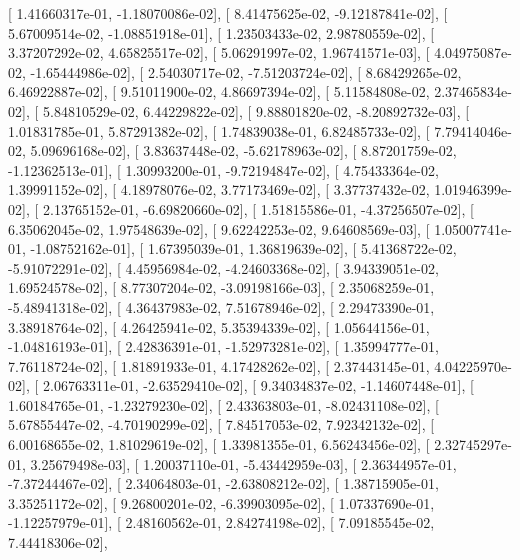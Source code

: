 \documentclass{article}
\begin{document}
       [  1.41660317e-01,  -1.18070086e-02],
       [  8.41475625e-02,  -9.12187841e-02],
       [  5.67009514e-02,  -1.08851918e-01],
       [  1.23503433e-02,   2.98780559e-02],
       [  3.37207292e-02,   4.65825517e-02],
       [  5.06291997e-02,   1.96741571e-03],
       [  4.04975087e-02,  -1.65444986e-02],
       [  2.54030717e-02,  -7.51203724e-02],
       [  8.68429265e-02,   6.46922887e-02],
       [  9.51011900e-02,   4.86697394e-02],
       [  5.11584808e-02,   2.37465834e-02],
       [  5.84810529e-02,   6.44229822e-02],
       [  9.88801820e-02,  -8.20892732e-03],
       [  1.01831785e-01,   5.87291382e-02],
       [  1.74839038e-01,   6.82485733e-02],
       [  7.79414046e-02,   5.09696168e-02],
       [  3.83637448e-02,  -5.62178963e-02],
       [  8.87201759e-02,  -1.12362513e-01],
       [  1.30993200e-01,  -9.72194847e-02],
       [  4.75433364e-02,   1.39991152e-02],
       [  4.18978076e-02,   3.77173469e-02],
       [  3.37737432e-02,   1.01946399e-02],
       [  2.13765152e-01,  -6.69820660e-02],
       [  1.51815586e-01,  -4.37256507e-02],
       [  6.35062045e-02,   1.97548639e-02],
       [  9.62242253e-02,   9.64608569e-03],
       [  1.05007741e-01,  -1.08752162e-01],
       [  1.67395039e-01,   1.36819639e-02],
       [  5.41368722e-02,  -5.91072291e-02],
       [  4.45956984e-02,  -4.24603368e-02],
       [  3.94339051e-02,   1.69524578e-02],
       [  8.77307204e-02,  -3.09198166e-03],
       [  2.35068259e-01,  -5.48941318e-02],
       [  4.36437983e-02,   7.51678946e-02],
       [  2.29473390e-01,   3.38918764e-02],
       [  4.26425941e-02,   5.35394339e-02],
       [  1.05644156e-01,  -1.04816193e-01],
       [  2.42836391e-01,  -1.52973281e-02],
       [  1.35994777e-01,   7.76118724e-02],
       [  1.81891933e-01,   4.17428262e-02],
       [  2.37443145e-01,   4.04225970e-02],
       [  2.06763311e-01,  -2.63529410e-02],
       [  9.34034837e-02,  -1.14607448e-01],
       [  1.60184765e-01,  -1.23279230e-02],
       [  2.43363803e-01,  -8.02431108e-02],
       [  5.67855447e-02,  -4.70190299e-02],
       [  7.84517053e-02,   7.92342132e-02],
       [  6.00168655e-02,   1.81029619e-02],
       [  1.33981355e-01,   6.56243456e-02],
       [  2.32745297e-01,   3.25679498e-03],
       [  1.20037110e-01,  -5.43442959e-03],
       [  2.36344957e-01,  -7.37244467e-02],
       [  2.34064803e-01,  -2.63808212e-02],
       [  1.38715905e-01,   3.35251172e-02],
       [  9.26800201e-02,  -6.39903095e-02],
       [  1.07337690e-01,  -1.12257979e-01],
       [  2.48160562e-01,   2.84274198e-02],
       [  7.09185545e-02,   7.44418306e-02],
\end{document}
